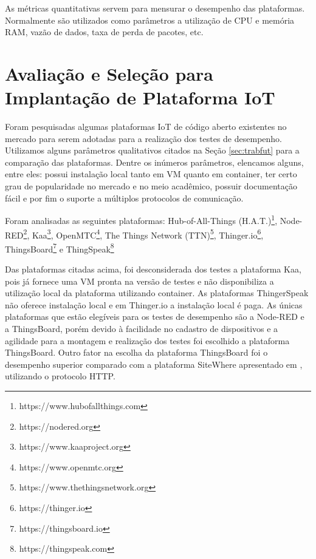 \documentclass{sbrt}
\begin{document}
As métricas quantitativas servem para mensurar o desempenho das plataformas. Normalmente são utilizados como parâmetros a utilização de CPU e memória RAM, vazão de dados, taxa de perda de pacotes, etc.

\section{Avaliação e Seleção para Implantação de Plataforma IoT}
\label{sec:ava}

Foram pesquisadas algumas plataformas IoT de código aberto existentes no mercado para serem adotadas para a realização dos testes de desempenho. Utilizamos alguns parâmetros qualitativos citados na Seção \ref{sec:trabfut} para a comparação das plataformas. Dentre os inúmeros parâmetros, elencamos alguns, entre eles: possui instalação local tanto em VM quanto em container, ter certo grau de popularidade no mercado e no meio acadêmico, possuir documentação fácil e por fim o suporte a múltiplos protocolos de comunicação.

Foram analisadas as seguintes plataformas: Hub-of-All-Things (H.A.T.)\footnote{https://www.hubofallthings.com}, Node-RED\footnote{https://nodered.org}, Kaa\footnote{https://www.kaaproject.org}, OpenMTC\footnote{https://www.openmtc.org}, The Things Network (TTN)\footnote{https://www.thethingsnetwork.org}, Thinger.io\footnote{https://thinger.io}, ThingsBoard\footnote{https://thingsboard.io} e ThingSpeak\footnote{https://thingspeak.com}

Das plataformas citadas acima, foi desconsiderada dos testes a plataforma Kaa, pois já fornece uma VM pronta na versão de testes e não disponibiliza a utilização local da plataforma utilizando container. As plataformas ThingerSpeak não oferece instalação local e em Thinger.io a instalação local é paga. As únicas plataformas que estão elegíveis para os testes de desempenho são a Node-RED e a ThingsBoard, porém devido à facilidade no cadastro de dispositivos e a agilidade para a montagem e realização dos testes foi escolhido a plataforma ThingsBoard. Outro fator na escolha da plataforma ThingsBoard foi o desempenho superior comparado com a plataforma SiteWhere apresentado em \cite{ismail2018performance}, utilizando o protocolo HTTP.
\end{document}
